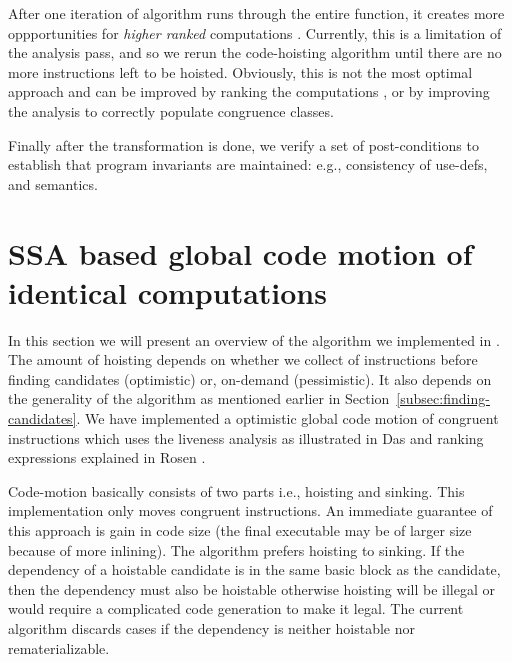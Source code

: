 \documentclass[acmlarge,review]{acmart}\settopmatter{printfolios=true}
\begin{document}
After one iteration of algorithm runs through the entire function, it creates
more oppportunities for \emph{higher ranked} computations
\cite{rosen1988global}. Currently, this is a limitation of the \GVN{} analysis
pass, and so we rerun the code-hoisting algorithm until there are no more
instructions left to be hoisted.  Obviously, this is not the most optimal
approach and can be improved by ranking the computations \cite{rosen1988global},
or by improving the \GVN{} analysis to correctly populate congruence classes.

Finally after the transformation is done, we verify a set of post-conditions to
establish that program invariants are maintained: e.g., consistency of use-defs,
and \SSA{} semantics.

\section{SSA based global code motion of identical computations}
\label{sec:implementation-details}
In this section we will present an overview of the algorithm we implemented in
\LLVM{}.  The amount of hoisting depends on whether we collect \GVN{} of
instructions before finding candidates (optimistic) or, on-demand
(pessimistic). It also depends on the generality of the \GVN{} algorithm as
mentioned earlier in Section~\ref{subsec:finding-candidates}. We have
implemented a optimistic global code motion of congruent instructions which uses
the liveness analysis as illustrated in Das \cite{das2012} and ranking
expressions explained in Rosen \cite{rosen1988global}.

Code-motion basically consists of two parts i.e., hoisting and sinking. This
implementation only moves congruent instructions. An immediate guarantee of this
approach is gain in code size (the final executable may be of larger size
because of more inlining). The algorithm prefers hoisting to sinking. If the
dependency of a hoistable candidate is in the same basic block as the candidate,
then the dependency must also be hoistable otherwise hoisting will be illegal or
would require a complicated code generation to make it legal. The current
algorithm discards cases if the dependency is neither hoistable nor
rematerializable.
\end{document}
